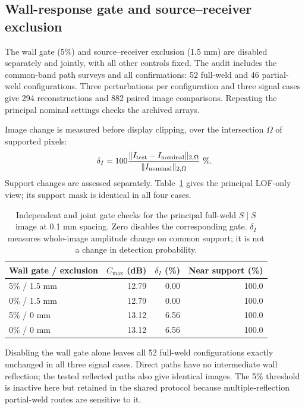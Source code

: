 \documentclass[11pt]{article}
\begin{document}
\subsection{Wall-response gate and source--receiver exclusion}
\label{saft:archive:full:gate_audit}
The wall gate (5\%) and source--receiver exclusion (1.5 mm) are disabled separately and jointly, with all other controls fixed. The audit includes the common-band path surveys and all confirmations: 52 full-weld and 46 partial-weld configurations. Three perturbations per configuration and three signal cases give 294 reconstructions and 882 paired image comparisons. Repeating the principal nominal settings checks the archived arrays.

Image change is measured before display clipping, over the intersection $\Omega$ of supported pixels:
\begin{equation}
 \delta_I=100\frac{\lVert I_{\rm test}-I_{\rm nominal}\rVert_{2,\Omega}}
 {\lVert I_{\rm nominal}\rVert_{2,\Omega}}\ \%.
\end{equation}
Support changes are assessed separately. Table~\ref{saft:archive:full:gate_controls} gives the principal LOF-only view; its support mask is identical in all four cases.

\begin{table}[htbp]\centering\small
\caption{Independent and joint gate checks for the principal
full-weld $S\mid S${}
image at 0.1 mm spacing. Zero disables the corresponding gate. $\delta_I$ measures whole-image amplitude change on common support; it is not a change in detection probability.}
\label{saft:archive:full:gate_controls}
\begin{tabular}{@{}lrrr@{}}\toprule
Wall gate / exclusion & $C_{\max}$ (dB) & $\delta_I$ (\%) & Near support (\%)\\\midrule
5\% / 1.5 mm & 12.79 & 0.00 & 100.0 \\
0\% / 1.5 mm & 12.79 & 0.00 & 100.0 \\
5\% / 0 mm & 13.12 & 6.56 & 100.0 \\
0\% / 0 mm & 13.12 & 6.56 & 100.0 \\

\bottomrule\end{tabular}
\end{table}

Disabling the wall gate alone leaves all 52 full-weld configurations exactly unchanged in all three signal cases. Direct paths have no intermediate wall reflection; the tested reflected paths also give identical images. The 5\% threshold is inactive here but retained in the shared protocol because multiple-reflection partial-weld routes are sensitive to it.
\end{document}
